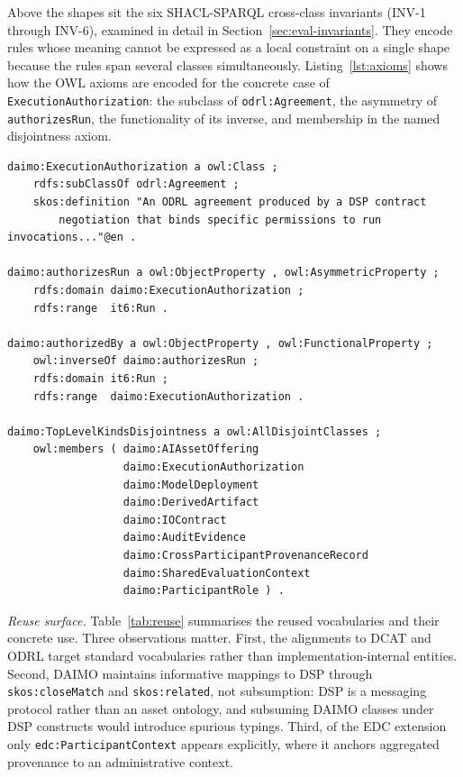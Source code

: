 \documentclass[11pt,a4paper]{article}
\newcommand{\code}[1]{\texttt{#1}}
\begin{document}
Above the shapes sit the six SHACL-SPARQL cross-class invariants (INV-1 through INV-6), examined in detail in Section~\ref{sec:eval-invariants}. They encode rules whose meaning cannot be expressed as a local constraint on a single shape because the rules span several classes simultaneously. Listing~\ref{lst:axioms} shows how the OWL axioms are encoded for the concrete case of \code{ExecutionAuthorization}: the subclass of \code{odrl:Agreement}, the asymmetry of \code{authorizesRun}, the functionality of its inverse, and membership in the named disjointness axiom.

\begin{lstlisting}[label=lst:axioms,caption={Core axioms around \code{ExecutionAuthorization}.}]
daimo:ExecutionAuthorization a owl:Class ;
    rdfs:subClassOf odrl:Agreement ;
    skos:definition "An ODRL agreement produced by a DSP contract
        negotiation that binds specific permissions to run invocations..."@en .

daimo:authorizesRun a owl:ObjectProperty , owl:AsymmetricProperty ;
    rdfs:domain daimo:ExecutionAuthorization ;
    rdfs:range  it6:Run .

daimo:authorizedBy a owl:ObjectProperty , owl:FunctionalProperty ;
    owl:inverseOf daimo:authorizesRun ;
    rdfs:domain it6:Run ;
    rdfs:range  daimo:ExecutionAuthorization .

daimo:TopLevelKindsDisjointness a owl:AllDisjointClasses ;
    owl:members ( daimo:AIAssetOffering
                  daimo:ExecutionAuthorization
                  daimo:ModelDeployment
                  daimo:DerivedArtifact
                  daimo:IOContract
                  daimo:AuditEvidence
                  daimo:CrossParticipantProvenanceRecord
                  daimo:SharedEvaluationContext
                  daimo:ParticipantRole ) .
\end{lstlisting}

\medskip\noindent\emph{Reuse surface.}\label{sec:reuse}
Table~\ref{tab:reuse} summarises the reused vocabularies and their concrete use. Three observations matter. First, the alignments to DCAT and ODRL target standard vocabularies rather than implementation-internal entities. Second, DAIMO maintains informative mappings to DSP through \code{skos:closeMatch} and \code{skos:related}, not subsumption: DSP is a messaging protocol rather than an asset ontology, and subsuming DAIMO classes under DSP constructs would introduce spurious typings. Third, of the EDC extension only \code{edc:ParticipantContext} appears explicitly, where it anchors aggregated provenance to an administrative context.
\end{document}
